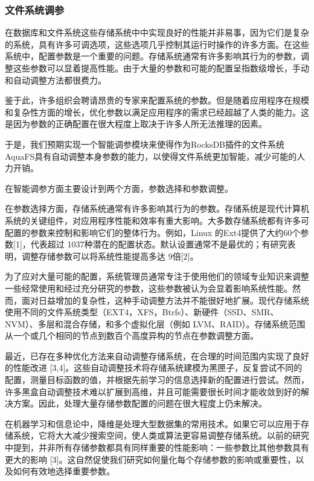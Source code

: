 \subsubsection{文件系统调参}

在数据库和文件系统这些存储系统中中实现良好的性能并非易事，因为它们是复杂的系统，具有许多可调选项，这些选项几乎控制其运行时操作的许多方面。在这些系统中，配置参数是一个重要的问题。存储系统通常有许多影响其行为的参数，调整这些参数可以显着提高性能。由于大量的参数和可能的配置呈指数级增长，手动和自动调整方法都很费力。

鉴于此，许多组织会聘请昂贵的专家来配置系统的参数。但是随着应用程序在规模和复杂性方面的增长，优化参数以满足应用程序的需求已经超越了人类的能力。这是因为参数的正确配置在很大程度上取决于许多人所无法推理的因素。

于是，我们预期实现一个智能调参模块来使得作为RocksDB插件的文件系统AquaFS具有自动调整本身参数的能力，以使得文件系统更加智能，减少可能的人力开销。

在智能调参方面主要设计到两个方面，参数选择和参数调整。

在参数选择方面，存储系统通常有许多影响其行为的参数。存储系统是现代计算机系统的关键组件，对应用程序性能和效率有重大影响。大多数存储系统都有许多可配置的参数来控制和影响它们的整体行为。例如，Linux 的Ext4提供了大约60个参数[1]，代表超过 1037种潜在的配置状态。默认设置通常不是最优的；有研究表明，调整存储参数可以将系统性能提高多达 9倍[2]。

为了应对大量可能的配置，系统管理员通常专注于使用他们的领域专业知识来调整一些经常使用和经过充分研究的参数，这些参数被认为会显着影响系统性能。然而，面对日益增加的复杂性，这种手动调整方法并不能很好地扩展。现代存储系统使用不同的文件系统类型（EXT4，XFS，Btrfs）、新硬件（SSD、SMR、NVM）、多层和混合存储，和多个虚拟化层（例如 LVM、RAID）。存储系统范围从一个或几个相同的节点到数百个高度异构的节点在参数调整方面。

最近，已存在多种优化方法来自动调整存储系统，在合理的时间范围内实现了良好的性能改进 [3,4]。这些自动调整技术将存储系统建模为黑匣子，反复尝试不同的配置，测量目标函数的值，并根据先前学习的信息选择新的配置进行尝试。然而，许多黑盒自动调整技术难以扩展到高维，并且可能需要很长时间才能收敛到好的解决方案。因此，处理大量存储参数配置的问题在很大程度上仍未解决。

在机器学习和信息论中，降维是处理大型数据集的常用技术。如果它可以应用于存储系统，它将大大减少搜索空间，使人类或算法更容易调整存储系统。以前的研究中提到，并非所有存储参数都具有同样重要的性能影响：一些参数比其他参数具有更大的影响 [3]。这自然促使我们研究如何量化每个存储参数的影响或重要性，以及如何有效地选择重要参数。

